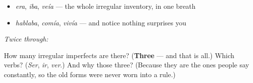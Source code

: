 \begin{itemize}
\raggedright
  \item \emph{era}, \emph{iba}, \emph{veía} — the whole irregular inventory, in one breath
  \item \emph{hablaba}, \emph{comía}, \emph{vivía} — and notice nothing surprises you
\end{itemize}

\emph{Twice through:}

\begin{tcolorbox}[breakable,colback=teal!4,colframe=teal!35!black,title={Before you move on}]
How many irregular imperfects are there? (\textbf{Three} — and that is all.) Which verbs? (\emph{Ser}, \emph{ir}, \emph{ver}.) And why those three? (Because they are the ones people say constantly, so the old forms were never worn into a rule.)
\end{tcolorbox}
